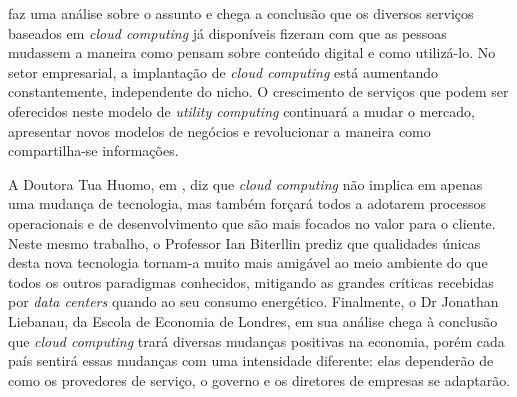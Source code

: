  faz uma análise sobre o assunto e chega a conclusão que
os diversos serviços baseados em \emph{cloud computing} já disponíveis fizeram com que as
pessoas mudassem a maneira como pensam sobre conteúdo digital e como utilizá-lo.
No setor empresarial, a implantação de \emph{cloud computing} está aumentando constantemente,
independente do nicho. O crescimento de serviços que
podem ser oferecidos neste modelo de \emph{utility computing} continuará a mudar o mercado,
apresentar novos modelos de negócios e revolucionar a maneira como compartilha-se informações.

A Doutora Tua Huomo, em , diz que \emph{cloud computing}
não implica em apenas uma mudança de tecnologia, mas também forçará todos a adotarem
processos operacionais e de desenvolvimento que são mais focados no valor para
o cliente. Neste mesmo trabalho, o Professor Ian Biterllin prediz que qualidades
únicas desta nova tecnologia tornam-a muito mais amigável ao meio ambiente
do que todos os outros paradigmas conhecidos, mitigando as grandes críticas
recebidas por \emph{data centers} quando ao seu consumo energético. Finalmente,
o Dr Jonathan Liebanau, da Escola de Economia de Londres, em sua análise chega
à conclusão que \emph{cloud computing} trará diversas mudanças positivas na economia, porém
cada país sentirá essas mudanças com uma intensidade diferente: elas dependerão de como
os provedores de serviço, o governo e os diretores de empresas se adaptarão.
